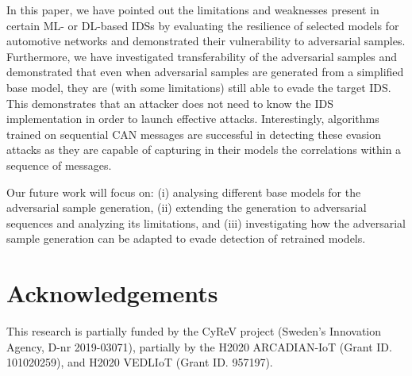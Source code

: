 \documentclass[conference]{IEEEtran}
\begin{document}
%
In this paper, we have pointed out the limitations and weaknesses present in certain ML- or DL-based IDSs by evaluating the resilience of selected models for automotive networks and demonstrated their vulnerability to adversarial samples. Furthermore, we have investigated transferability of the adversarial samples and demonstrated that even when adversarial samples are generated from a simplified base model, they are (with some limitations) still able to evade the target IDS. This demonstrates that an attacker does not need to know the IDS implementation in order to launch effective attacks. Interestingly, algorithms trained on sequential CAN messages are successful in detecting these evasion attacks as they are capable of capturing in their models the correlations within a sequence of messages.



Our future work will focus on: (i) analysing  different base models for the adversarial sample generation, (ii) extending the generation to adversarial sequences and analyzing its limitations, and (iii) investigating how the adversarial sample generation can be adapted to evade detection of retrained models.



\section{Acknowledgements}
This research is partially funded by the CyReV project (Sweden's Innovation Agency, D-nr 2019-03071), partially by the H2020  ARCADIAN-IoT (Grant ID. 101020259), and  H2020 VEDLIoT (Grant ID. 957197).




\end{document}

